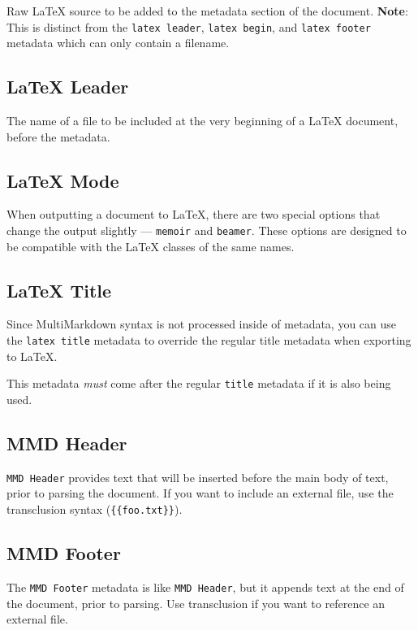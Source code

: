 Raw LaTeX source to be added to the metadata section of the document. \textbf{Note}: This is distinct from the \texttt{latex leader}, \texttt{latex begin}, and \texttt{latex footer} metadata which can only contain a filename.

\subsection{LaTeX Leader }
\label{latexleader}

The name of a file to be included at the very beginning of a LaTeX document, before the metadata.

\subsection{LaTeX Mode }
\label{latexmode}

When outputting a document to LaTeX, there are two special options that change
the output slightly --- \texttt{memoir} and \texttt{beamer}. These options are designed to
be compatible with the LaTeX classes of the same names.

\subsection{LaTeX Title }
\label{latextitle}

Since MultiMarkdown syntax is not processed inside of metadata, you can use the \texttt{latex title} metadata to override the regular title metadata when exporting to LaTeX.

This metadata \emph{must} come after the regular \texttt{title} metadata if it is also being used.

\subsection{MMD Header }
\label{mmdheader}

\texttt{MMD Header} provides text that will be inserted before the main body of text, prior to parsing the document. If you want to include an external file, use the transclusion syntax (\texttt{\{\{foo.txt\}\}}).

\subsection{MMD Footer }
\label{mmdfooter}

The \texttt{MMD Footer} metadata is like \texttt{MMD Header}, but it appends text at the end of the document, prior to parsing. Use transclusion if you want to reference an external file.

